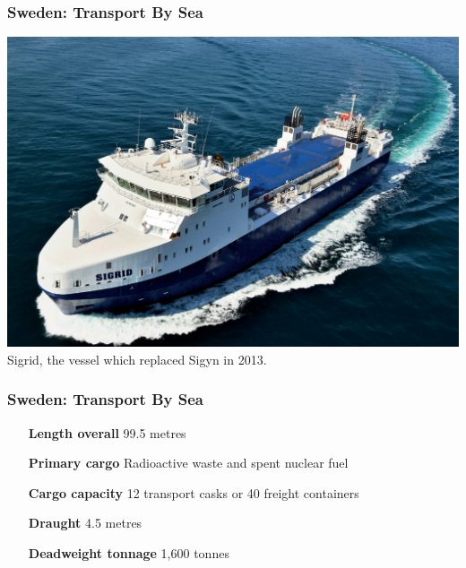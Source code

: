 \begin{frame}[c]
\frametitle{Sweden: Transport By Sea}

\includegraphics[width=\textwidth]{./images/sweden-sigrid}
Sigrid, the vessel which replaced Sigyn in 2013.

\end{frame}

\begin{frame}[c]
\frametitle{Sweden: Transport By Sea}
\begin{center}
\begin{itemize}
\item[\textbf{Length overall}] 99.5 metres
                \item[\textbf{Primary cargo}] Radioactive waste and spent nuclear fuel
                \item[\textbf{Cargo capacity}] 12 transport casks or 40 freight containers
                \item[\textbf{Draught}] 4.5 metres
                \item[\textbf{Deadweight tonnage}] 1,600 tonnes
        \end{itemize}
\end{center}
\end{frame}
